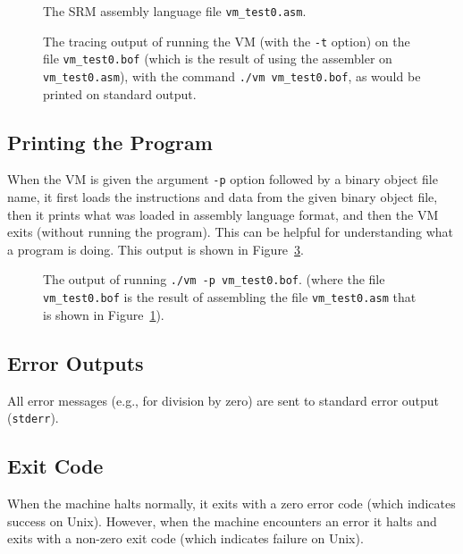 \documentclass[11pt,letterpaper]{article}
\newcommand{\LSTFILE}[1]{

}
\newcommand{\figref}[1]{Figure~\ref{#1}}  %
\begin{document}
\begin{figure}
\LSTFILE{vm_test0.asm}
\caption{The SRM assembly language file \texttt{vm\_test0.asm}.} 
\label{fig:test0asm}
\end{figure}

\begin{figure}

\caption{The tracing output of running the VM (with the \texttt{-t} option)
  on the file \texttt{vm\_test0.bof}
  (which is the result of using the assembler on \texttt{vm\_test0.asm}),
  with the command \texttt{./vm vm\_test0.bof},
  as would be printed on standard output.} 
\label{fig:test0output}
\end{figure}

\subsection{Printing the Program}
\label{sec:printing}

When the VM is given the argument \texttt{-p} option followed by a
binary object file name, it first loads the instructions and data from the
given binary object file, then it prints what was loaded in assembly
language format, and then the VM exits (without running the program). This
can be helpful for understanding what a program is doing. This output
is shown in \figref{fig:test0listing}.

\begin{figure}
\LSTFILE{vm_test0.lst}
\caption{The output of running \texttt{./vm -p vm\_test0.bof}. 
  (where the file \texttt{vm\_test0.bof} is the result of assembling the file
  \texttt{vm\_test0.asm} that is shown in \figref{fig:test0asm}).} 
\label{fig:test0listing}
\end{figure}

\subsection{Error Outputs}

All error messages (e.g., for division by zero) are sent to
standard error output (\texttt{stderr}).

\subsection{Exit Code}

When the machine halts normally, it exits with a zero error code
(which indicates success on Unix).  However, when the machine
encounters an error it halts and exits with a non-zero exit code
(which indicates failure on Unix).
\end{document}
